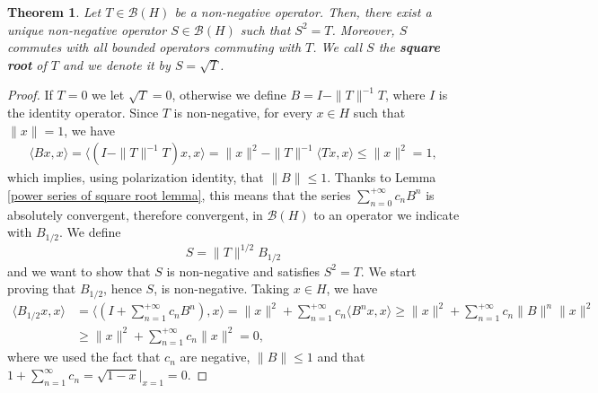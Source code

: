 \documentclass[corpo=11pt, stile=classica, tipotesi=custom,
greek, evenboxes, english]{toptesi}
\numberwithin{equation}{chapter}
\newtheorem{teo}{Theorem}[chapter] %
\theoremstyle{definition}
\theoremstyle{remark}
\newcommand{\B}{\mathscr{B}} %
\begin{document}
\begin{teo}\label{existence of square root}
	Let $T \in \B(H)$ be a non-negative operator. Then, there exist a unique non-negative operator $S \in \B(H)$ such that $S^2 = T$. Moreover, $S$ commutes with all bounded operators commuting with $T$.	We call $S$ the \textbf{square root} of $T$ and we denote it by $S = \sqrt{T}$.
\end{teo}
\begin{proof}
	If $T=0$ we let $\sqrt{T}=0$, otherwise we define $B = I - \|T\|^{-1}T$, where $I$ is the identity operator.
	Since $T$ is non-negative, for every $x \in H$ such that $\|x\| = 1$, we have
	\begin{align*}
		\langle Bx,x \rangle = \langle (I-\|T\|^{-1}T)x, x\rangle = \|x\|^2 - \|T\|^{-1}\langle Tx,x \rangle \leq \|x\|^2 = 1,
	\end{align*}
	which implies, using polarization identity, that $\|B\| \leq 1$. Thanks to Lemma \ref{power series of square root lemma}, this means that the series $\sum_{n=0}^{+\infty}c_n B^n$ is absolutely convergent, therefore convergent, in $\B(H)$ to an operator we indicate with $B_{1/2}$. We define
	\begin{equation}\label{square root of an operator}
		S = \|T\|^{1/2} B_{1/2}
	\end{equation}
	and we want to show that $S$ is non-negative and satisfies $S^2 = T$. We start proving that $B_{1/2}$, hence $S$, is non-negative. Taking $x \in H$, we have
	\begin{align*}
		\langle B_{1/2}x,x \rangle &= \langle (I + \sum_{n=1}^{+\infty} c_n B^n),x \rangle = \|x\|^2 + \sum_{n=1}^{+\infty} c_n\langle B^n x,x \rangle \geq \|x\|^2 + \sum_{n=1}^{+\infty} c_n \|B\|^n \|x\|^2 \\
								   &\geq \|x\|^2 + \sum_{n=1}^{+\infty} c_n \|x\|^2 = 0,
	\end{align*}
	where we used the fact that $c_n$ are negative, $\|B\| \leq 1$ and that $1 + \sum_{n=1}^{\infty}c_n = \sqrt{1-x}\rvert_{x=1} = 0$.
	

\end{proof}
\end{document}

